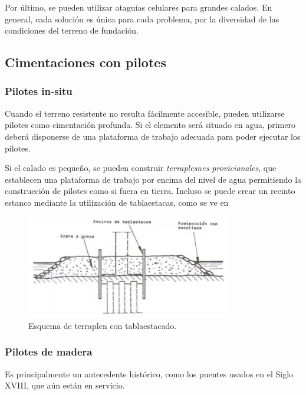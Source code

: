 \documentclass[../main.tex]{subfiles}
\begin{document}
Por último, se pueden utilizar ataguías celulares para grandes calados. En general,
cada solución es única para cada problema, por la diversidad de las condiciones 
del terreno de fundación.

\subsection{Cimentaciones con pilotes}

\subsubsection{Pilotes in-situ}

Cuando el terreno resistente no resulta fácilmente accesible, pueden utilizarse
pilotes como cimentación profunda. Si el elemento será situado en agua, primero
deberá disponerse de una plataforma de trabajo adecuada para poder ejecutar los
pilotes.

Si el calado es pequeño, se pueden construir \textit{terraplesnes provicionales},
que establecen una plataforma de trabajo por encima del nivel de agua permitiendo
la construcción de pilotes como si fuera en tierra. Incluso se puede crear un
recinto estanco mediante la utilización de tablaestacas, como se ve en 

\begin{figure}[htpb]
  \centering
  \includegraphics[width=0.8\textwidth]{../images/20210419/terraplen-estanco}
  \caption{Esquema de terraplen con tablaestacado.}
  \label{fig:terraplen-estanco}
\end{figure}

\subsubsection{Pilotes de madera}

Es principalmente un antecedente histórico, como los puentes usados en el Siglo
XVIII, que aún están en servicio. 
\end{document}
